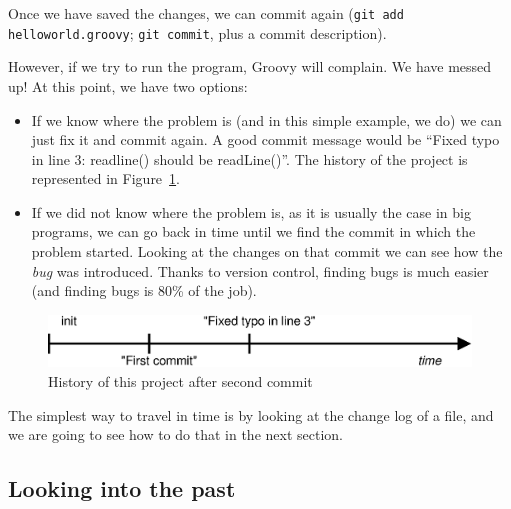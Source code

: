 Once we have saved the changes, we can commit again 
(\verb+git add helloworld.groovy+; \verb+git commit+, 
plus a commit description). 

However, if we try to run the program, Groovy will complain. 
We have messed up! At this point, we have two options:

\begin{itemize}
\item If we know where the problem is (and in this simple example, we
  do) we can just fix it and commit again. A good commit message would
  be ``Fixed typo in line 3: readline() should be readLine()''. The
  history of the project is represented in
  Figure~\ref{fig:git-example-2}. 
\item If we did not know where the problem is, as it is usually the
  case in big programs, we can go back in time
  until we find the commit in
  which the problem started. Looking at the changes on that commit we
  can see how the \emph{bug} was introduced. Thanks to version
  control, finding bugs is much easier (and 
  finding bugs is 80\% of the job). 
\end{itemize}

\begin{figure}[htbp!]
  \centering
  \includegraphics[width=\textwidth]{gfx/commit_history_2.eps}
  \caption{History of this project after second commit}
  \label{fig:git-example-2}
\end{figure}

The simplest way to travel in time is by looking at the change log of
a file, and we are going to see how to do that in the next section. 

\subsection{Looking into the past}
\label{sec:looking-into-past}


